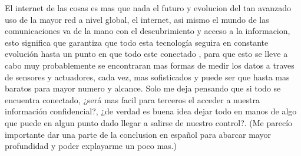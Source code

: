 \documentclass{IEEEtran}
\begin{document}
El internet de las cosas es mas que nada el futuro y evolucion del tan avanzado uso de la mayor red a nivel global, el internet, asi mismo el mundo de las comunicaciones
va de la mano con el descubrimiento y acceso a la informacion, esto significa que garantiza que todo esta tecnología seguira en constante evolución hasta un punto en que todo este conectado 
, para que esto se lleve a cabo muy probablemente se encontraran mas formas de medir los datos a traves de sensores y actuadores, cada vez, mas sofisticados y puede ser 
que hasta mas baratos para mayor numero y alcance. Solo me deja pensando que si todo se encuentra conectado, ¿será mas facil para terceros el acceder a nuestra información 
confidencial?, ¿de verdad es buena idea dejar todo en manos de algo que puede en algun punto dado llegar a salirse de nuestro control?. 
(Me parecío importante dar una parte de la conclusion en español para abarcar mayor profundidad y poder explayarme un poco mas.)





\end{document}
